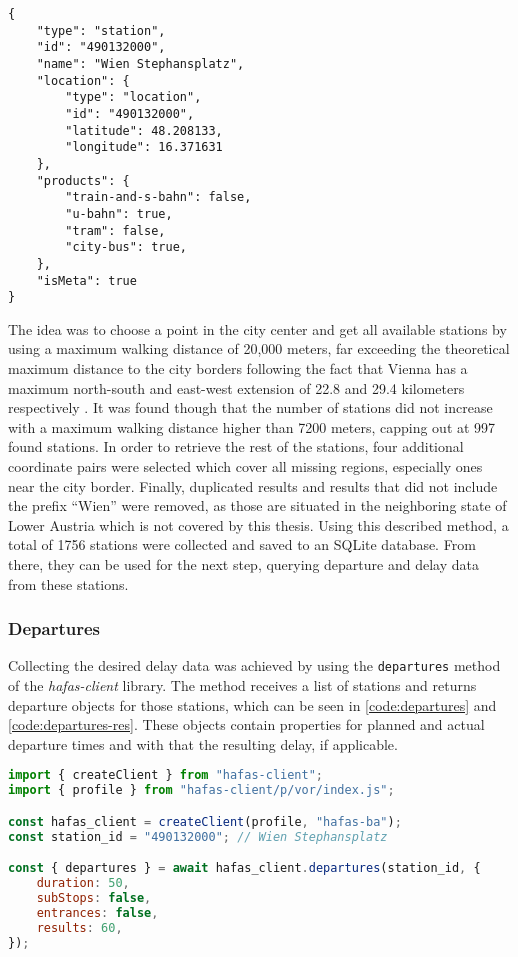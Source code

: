 \begin{lstlisting}[caption={\texttt{station} object returned by the \ac{HAFAS} \ac{API}}, label={code:station-res}]
{
	"type": "station",
	"id": "490132000",
	"name": "Wien Stephansplatz",
	"location": {
		"type": "location",
		"id": "490132000",
		"latitude": 48.208133,
		"longitude": 16.371631
	},
	"products": {
		"train-and-s-bahn": false,
		"u-bahn": true,
		"tram": false,
		"city-bus": true,
	},
	"isMeta": true
}
\end{lstlisting}

The idea was to choose a point in the city center and get all available stations by using a maximum walking distance of 20,000 meters, far exceeding the theoretical maximum distance to the city borders following the fact that Vienna has a maximum north-south and east-west extension of 22.8  and 29.4 kilometers respectively \autocite[14]{stadt-wien-2022}. It was found though that the number of stations did not increase with a maximum walking distance higher than 7200 meters, capping out at 997 found stations. In order to retrieve the rest of the stations, four additional coordinate pairs were selected which cover all missing regions, especially ones near the city border. Finally, duplicated results and results that did not include the prefix \enquote{Wien} were removed, as those are situated in the neighboring state of Lower Austria which is not covered by this thesis. Using this described method, a total of 1756 stations were collected and saved to an SQLite database. From there, they can be used for the next step, querying departure and delay data from these stations.

\subsubsection{Departures}

Collecting the desired delay data was achieved by using the \texttt{departures} method of the \textit{hafas-client} library. The method receives a list of stations and returns departure objects for those stations, which can be seen in \cref{code:departures} and \cref{code:departures-res}. These objects contain properties for planned and actual departure times and with that the resulting delay, if applicable. 

\begin{lstlisting}[language=JavaScript, caption={Retrieving departures from a given station ID}, label={code:departures}]
import { createClient } from "hafas-client";
import { profile } from "hafas-client/p/vor/index.js";

const hafas_client = createClient(profile, "hafas-ba");
const station_id = "490132000"; // Wien Stephansplatz

const { departures } = await hafas_client.departures(station_id, {
	duration: 50,
	subStops: false,
	entrances: false,
	results: 60,
});
\end{lstlisting}

